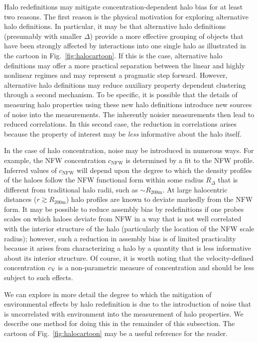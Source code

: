 \documentclass[usenatbib,fleqn]{mnras}
\begin{document}
Halo redefinitions may mitigate concentration-dependent halo bias for at least two reasons. The first reason is the physical motivation for exploring alternative halo definitions. In particular, it may be that alternative halo definitions (presumably with smaller $\Delta$) provide a more effective grouping of objects that have been strongly affected by interactions into one single halo as  illustrated in the cartoon in Fig.~\ref{fig:halocartoon}. If this is the case, alternative halo definitions may offer a more practical separation between the linear and highly nonlinear regimes and may represent a pragmatic step forward. However, alternative halo definitions may reduce auxiliary property dependent clustering through a second mechanism. To be specific, it is possible that the details of measuring halo properties using these new halo definitions introduce new sources of noise into the measurements. The inherently noisier measurements then lead to reduced correlations. In this second case, the reduction in correlations arises because the property of interest may be {\em less} informative about the halo itself.

In the case of halo concentration, noise may be introduced in numerous ways. For example, the NFW concentration $c_{\mathrm{NFW}}$ is determined by a fit to the NFW profile. Inferred values of $c_{\mathrm{NFW}}$ will depend upon the degree to which the density profiles of the haloes follow the NFW functional form within some radius $R_{\Delta}$ that is different from traditional halo radii, such as $\sim R_{200\text{m}}$. At large halocentric distances ($r \gtrsim R_{200\text{m}}$) halo profiles are known to deviate markedly from the NFW form. It may be possible to reduce assembly bias by redefinitions if one probes scales on which haloes deviate from NFW in a way that is not well correlated with the interior structure of the halo (particularly the location of the NFW scale radius); however, such a reduction in assembly bias is of limited practicality because it arises from characterizing a halo by a quantity that is less informative about its interior structure. Of course, it is worth noting that the velocity-defined concentration $c_{\rm V}$ is a non-parametric measure of concentration and should be less subject to such effects. 

We can explore in more detail the degree to which the mitigation of environmental effects by halo redefinition is due to the introduction of noise that is uncorrelated with environment into the measurement of halo properties. We describe one method for doing this in the remainder of this subsection. The cartoon of Fig.~\ref{fig:halocartoon} may be a useful reference for the reader. 
\end{document}
